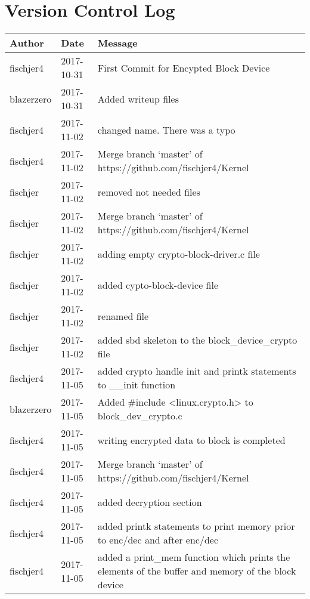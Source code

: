 \documentclass[draftclsnofoot, onecolumn, 10pt, compsoc]{IEEEtran}
\begin{document}
	\section{Version Control Log}
		\begin{center}
			\begin{longtabu} to \textwidth {| X[4,l] | X[3,c] | X[8,l] |}
				\hline
				\textbf{Author} & \textbf{Date} & \textbf{Message} \\ \hline
				fischjer4 & 2017-10-31 & First Commit for Encypted Block Device \\ \hline
				blazerzero & 2017-10-31 & Added writeup files \\ \hline
				fischjer4 & 2017-11-02 & changed name. There was a typo \\ \hline
				fischjer4 & 2017-11-02 & Merge branch `master' of https://github.com/fischjer4/Kernel \\ \hline
				fischjer & 2017-11-02 & removed not needed files \\ \hline
				fischjer & 2017-11-02 & Merge branch `master' of https://github.com/fischjer4/Kernel \\ \hline
				fischjer & 2017-11-02 & adding empty crypto-block-driver.c file \\ \hline
				fischjer & 2017-11-02 & added cypto-block-device file \\ \hline
				fischjer & 2017-11-02 & renamed file \\ \hline
				fischjer & 2017-11-02 & added sbd skeleton to the block\_device\_crypto file \\ \hline
				fischjer4 & 2017-11-05 & added crypto handle init and printk statements to \_\_init function \\ \hline
				blazerzero & 2017-11-05 & Added \#include \textless{}linux.crypto.h\textgreater{} to block\_dev\_crypto.c \\ \hline
				fischjer4 & 2017-11-05 & writing encrypted data to block is completed \\ \hline
				fischjer4 & 2017-11-05 & Merge branch `master' of https://github.com/fischjer4/Kernel \\ \hline
				fischjer4 & 2017-11-05 & added decryption section \\ \hline
				fischjer4 & 2017-11-05 & added printk statements to print memory prior to enc/dec and after enc/dec \\ \hline
				fischjer4 & 2017-11-05 & added a print\_mem function which prints the elements of the buffer and memory of the block device \\ \hline

\end{longtabu}
\end{center}
\end{document}
